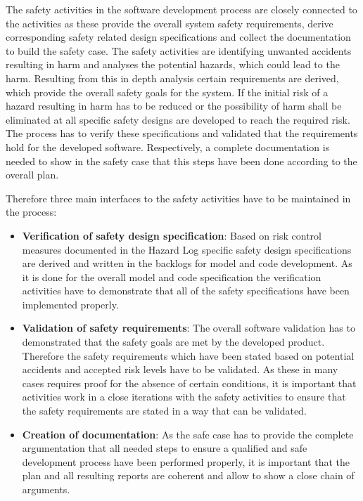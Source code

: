 \documentclass{template/openetcs_report}
\begin{document}
The safety activities in the software development process are closely connected to the \vv activities as these provide the overall system safety requirements, derive corresponding safety related design specifications and collect the \vv documentation to build the safety case. The safety activities are identifying unwanted accidents resulting in harm and analyses the potential hazards, which could lead to the harm. Resulting from this in depth  analysis certain requirements are derived, which provide the overall safety goals for the system. If the initial risk of a hazard resulting in harm has to be reduced or the possibility of harm shall be eliminated at all specific safety designs are developed to reach the required risk. The \vv process has to verify these specifications and validated that the requirements hold for the developed software. Respectively, a complete documentation is needed to show in the safety case that this steps have been done according to the overall \vv plan.

Therefore three main interfaces to the safety activities have to be maintained in the \vv process:
\begin{itemize}
\item \textbf{Verification of safety design specification}: Based on risk control measures documented in the Hazard Log specific safety design specifications are derived and written in the backlogs for model and code development. As it is done for the overall model and code specification the verification activities have to demonstrate that all of the safety specifications have been implemented properly.
\item \textbf{Validation of safety requirements}: The overall software validation has to demonstrated that the safety goals are met by the developed product. Therefore the safety requirements which have been stated based on potential accidents and accepted risk levels have to be validated. As these in many cases requires proof for the absence of certain conditions, it is important that \vv activities work in a close iterations with the safety activities to ensure that the safety requirements are stated in a way that can be validated. 
\item \textbf{Creation of \vv documentation}: As the safe case has to provide the complete argumentation that all needed steps to ensure a qualified and safe development process have been performed properly, it is important that the \vv plan and all resulting \vv reports are coherent and allow to show a close chain of arguments. 
\end{itemize}
\end{document}
